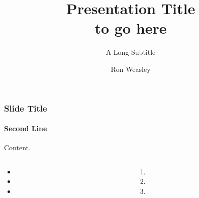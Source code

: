 \documentclass[aspectratio=169]{beamer}
\title{Presentation Title\\to go here}
\subtitle{A Long Subtitle}
\author{Ron Weasley}
\institute[Computer Science]{Liverpool}
\begin{document}
%
%
\begin{frame}
\maketitle
\end{frame}

\begin{frame}[t]
    \frametitle{Slide Title}
    \framesubtitle{Second Line}

    Content.
    \lipsum[1][1-2]

    \begin{columns}[T]
        \begin{column}{0.5\textwidth}
            \begin{itemize}
                \item \lipsum[1][2]
                \item \lipsum[2][2]
                \item \lipsum[3][2]
            \end{itemize}
        \end{column}

        \begin{column}{0.5\textwidth}
            \begin{enumerate}
                \item \lipsum[3][1]
                \item \lipsum[4][2]
                \item \lipsum[5][2]
            \end{enumerate}
        \end{column}
    \end{columns}
\end{frame}
\end{document}
